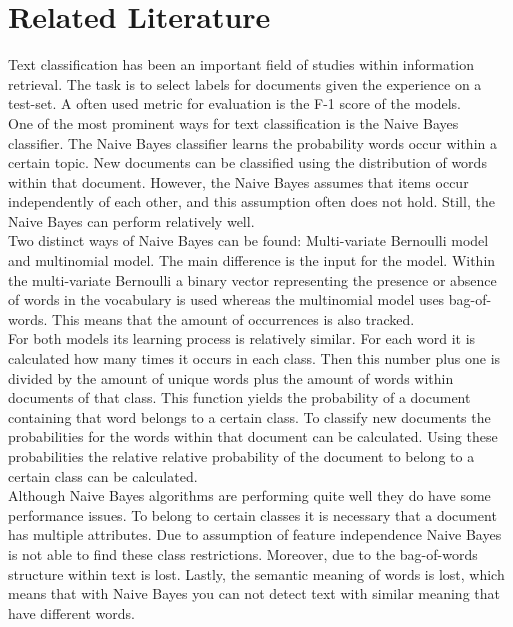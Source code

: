 \documentclass[a4paper]{article}
\begin{document}
\section{Related Literature}
Text classification has been an important field of studies within information retrieval. The task is to select labels for documents given the experience on a test-set. A often used metric for evaluation is the F-1 score of the models. \cite{allahyari2017brief}\\
One of the most prominent ways for text classification is the Naive Bayes classifier. The Naive Bayes classifier learns the probability words occur within a certain topic. New documents can be classified using the distribution of words within that document. However, the Naive Bayes assumes that items occur independently of each other, and this assumption often does not hold. Still, the Naive Bayes can perform relatively well. \cite{allahyari2017brief}\\
Two distinct ways of Naive Bayes can be found: Multi-variate Bernoulli model and multinomial model. The main difference is the input for the model. Within the multi-variate Bernoulli a binary vector representing the presence or absence of words in the vocabulary is used whereas the multinomial model uses bag-of-words. This means that the amount of occurrences is also tracked. \cite{mccallum1998comparison} \\
For both models its learning process is relatively similar. For each word it is calculated how many times it occurs in each class. Then this number plus one is divided by the amount of unique words plus the amount of words within documents of that class. This function yields the probability of a document containing that word belongs to a certain class. To classify new documents the probabilities for the words within that document can be calculated. Using these probabilities the relative relative probability of the document to belong to a certain class can be calculated. \cite{mccallum1998comparison}\\
Although Naive Bayes algorithms are performing quite well they do have some performance issues. To belong to certain classes it is necessary that a document has multiple attributes. Due to assumption of feature independence Naive Bayes is not able to find these class restrictions. Moreover, due to the bag-of-words structure within text is lost. Lastly, the semantic meaning of words is lost, which means that with Naive Bayes you can not detect text with similar meaning that have different words.\\
\end{document}
